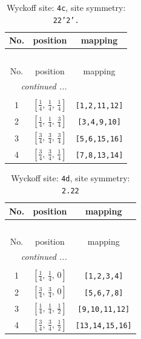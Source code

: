 \documentclass[fleqn,8pt]{jsarticle}
\begin{document}
\renewcommand{\arraystretch}{1.2}
\begin{longtable}{ccc}
\caption{Wyckoff site: {\tt 4c}, site symmetry: {\tt 22'2'.}}
 \\
 \hline \hline
No. & position & mapping \\ \hline \endfirsthead

\multicolumn{2}{l}{\tablename\ \thetable{}} \\
 \hline \hline
No. & position & mapping \\ \hline \endhead

 \hline \hline
\multicolumn{2}{r}{\footnotesize\it continued ...} \\ \endfoot

 \hline \hline
\multicolumn{2}{r}{} \\ \endlastfoot

1 & $\left[ \frac{1}{4},\, \frac{1}{4},\, \frac{1}{4} \right]$ & {\tt [1,2,11,12]} \\ \hline
2 & $\left[ \frac{1}{4},\, \frac{1}{4},\, \frac{3}{4} \right]$ & {\tt [3,4,9,10]} \\ \hline
3 & $\left[ \frac{3}{4},\, \frac{3}{4},\, \frac{3}{4} \right]$ & {\tt [5,6,15,16]} \\ \hline
4 & $\left[ \frac{3}{4},\, \frac{3}{4},\, \frac{1}{4} \right]$ & {\tt [7,8,13,14]} \\
\end{longtable}
\renewcommand{\arraystretch}{1.2}
\begin{longtable}{ccc}
\caption{Wyckoff site: {\tt 4d}, site symmetry: {\tt 2.22}}
 \\
 \hline \hline
No. & position & mapping \\ \hline \endfirsthead

\multicolumn{2}{l}{\tablename\ \thetable{}} \\
 \hline \hline
No. & position & mapping \\ \hline \endhead

 \hline \hline
\multicolumn{2}{r}{\footnotesize\it continued ...} \\ \endfoot

 \hline \hline
\multicolumn{2}{r}{} \\ \endlastfoot

1 & $\left[ \frac{1}{4},\, \frac{1}{4},\, 0 \right]$ & {\tt [1,2,3,4]} \\ \hline
2 & $\left[ \frac{3}{4},\, \frac{3}{4},\, 0 \right]$ & {\tt [5,6,7,8]} \\ \hline
3 & $\left[ \frac{1}{4},\, \frac{1}{4},\, \frac{1}{2} \right]$ & {\tt [9,10,11,12]} \\ \hline
4 & $\left[ \frac{3}{4},\, \frac{3}{4},\, \frac{1}{2} \right]$ & {\tt [13,14,15,16]} \\
\end{longtable}
\end{document}
